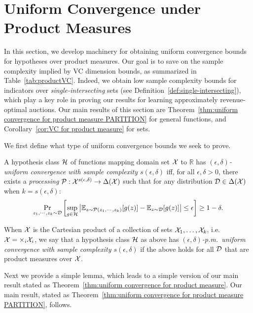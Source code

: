 \section{Uniform Convergence under Product Measures}\label{sec:uniform convergence under product measure}

In this section, we develop machinery for obtaining uniform convergence bounds for hypotheses over product measures. Our goal is to save on the sample complexity implied by VC dimension bounds, as summarized in Table~\ref{tab:productVC}. Indeed, we obtain low sample complexity  bounds for indicators over \emph{single-intersecting} sets (see Definition~\ref{def:single-intersecting}), which play a key role in proving our results for learning approximately revenue-optimal auctions. Our main results of this section are Theorem~\ref{thm:uniform convergence for product measure PARTITION} for general functions, and Corollary~\ref{cor:VC for product measure} for sets.

We first define what type of uniform convergence bounds we seek to prove.

\begin{definition}
	A hypothesis class ${\mathcal{H}}$ of functions mapping domain set ${\mathcal{X}}$ to $\mathbb{R}$ has {\em $(\epsilon,\delta)$-uniform convergence with sample complexity $s(\epsilon,\delta)$} iff, for all $\epsilon,\delta > 0$, there exists a {\em processing} ${\cal P}:{\cal X}^{s(\epsilon,\delta)} \rightarrow \Delta({\mathcal{X}})$ such that for any distribution ${\mathcal{D}} \in \Delta({\mathcal{X}})$ when $k=s(\epsilon,\delta)$: 
	\begin{align}
	\Pr_{z_1,\cdots, z_k \sim {\mathcal{D}}}\left[\sup_{g\in {\mathcal{H}}}\left|{\mathbb{E}}_{z\sim {\cal P}(z_1,\cdots, z_k)}[g(z)] - {\mathbb{E}}_{z\sim {\mathcal{D}}}[g(z)]\right|\leq \epsilon\right]\geq 1-\delta. \notag
	\end{align}

When ${\cal X}$ is the Cartesian product of a collection of sets ${\cal X}_1,\ldots,{\cal X}_k$, i.e.~${\cal X} =\times_i {\cal X}_i$, we say that a hypothesis class ${\mathcal{H}}$ as above has {\em $(\epsilon,\delta)$-p.m.~uniform convergence with sample complexity $s(\epsilon,\delta)$} if the above holds for all ${\cal D}$ that are product measures over ${\cal X}$.	
\end{definition}

Next we provide a simple lemma, which leads to a simple version of our main result stated as Theorem~\ref{thm:uniform convergence for product measure}. Our main result, stated as Theorem~\ref{thm:uniform convergence for product measure PARTITION}, follows.

